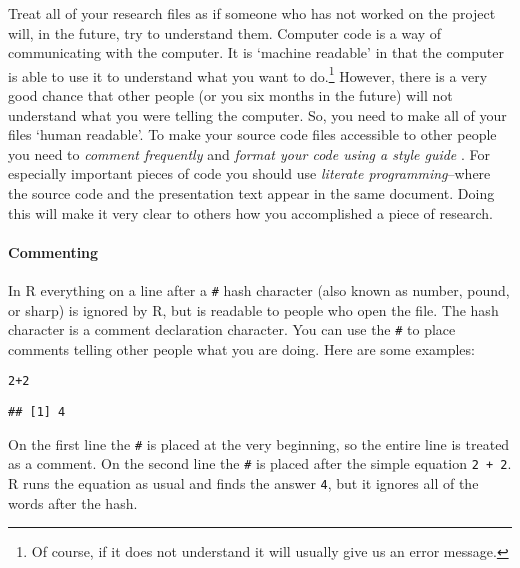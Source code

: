 Treat all of your research files as if someone who has not worked on the project will, in the future, try to understand them. Computer code is a way of communicating with the computer. It is `machine readable' in that the computer is able to use it to understand what you want to do.\footnote{Of course, if it does not understand it will usually give us an error message.} However, there is a very good chance that other people (or you six months in the future) will not understand what you were telling the computer. So, you need to make all of your files `human readable'. To make your source code files accessible to other people you need to {\emph{comment frequently}} \cite[3]{Bowers2011} and {\emph{format your code using a style guide}} \cite[]{Nagler1995}. For especially important pieces of code you should use {\emph{literate programming}}--where the source code and the presentation text appear in the same document. Doing this will make it very clear to others how you accomplished a piece of research.

\paragraph{Commenting}
In R everything on a line after a {\tt{\#}} hash character (also known as number, pound, or sharp) is ignored by R, but is readable to people who open the file. The hash character is a comment declaration character. You can use the {\tt{\#}} to place comments telling other people what you are doing. Here are some examples:

\begin{knitrout}
\color{fgcolor}\begin{kframe}
\begin{alltt}
2 + 2  
\end{alltt}
\begin{verbatim}
## [1] 4
\end{verbatim}
\end{kframe}
\end{knitrout}


\noindent On the first line the {\tt{\#}} is placed at the very beginning, so the entire line is treated as a comment. On the second line the {\tt{\#}} is placed after the simple equation \texttt{2 + 2}. R runs the equation as usual and finds the answer {\tt{4}}, but it ignores all of the words after the hash. 

